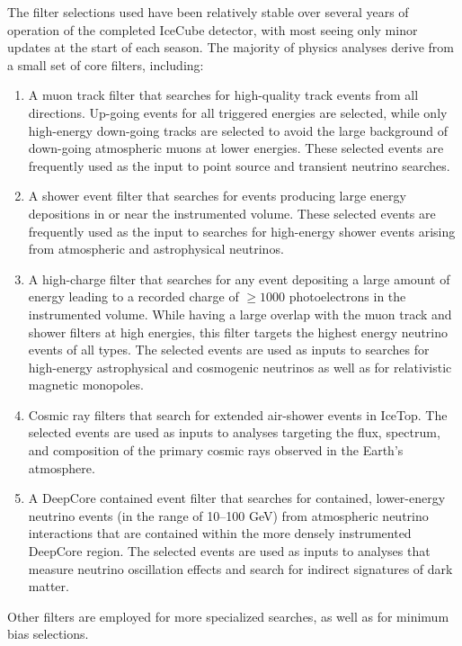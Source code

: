 The filter selections used have been relatively stable over several years
of operation of the completed IceCube detector, with most seeing only minor
updates at the 
start of each season.  The majority of physics analyses derive from a small
set of core filters, including:

\begin{enumerate}
\item A muon track filter that searches for high-quality track events from all
  directions.  Up-going events for all triggered energies are selected,
  while only high-energy 
  down-going tracks are selected to avoid the large background of
  down-going atmospheric muons at lower energies.  These selected events
  are frequently used as the input to point source and transient neutrino searches.
\item A shower event filter that searches for events producing large energy
  depositions in or near the instrumented volume.  These selected events are
  frequently used as the input to searches for high-energy shower events arising from
  atmospheric and astrophysical neutrinos.
\item A high-charge filter that searches for any event depositing a
  large amount of energy leading to a recorded charge of $\geq1000$
  photoelectrons in the 
  instrumented volume.  While having a large overlap with the muon track
  and shower filters at high energies, this filter targets the highest
  energy neutrino events of all types. The selected events are used as
  inputs to searches for high-energy astrophysical and cosmogenic
  neutrinos as well as for relativistic magnetic monopoles.
\item Cosmic ray filters that search for extended air-shower events in
  IceTop.  The selected events are used as inputs to analyses 
  targeting the flux, spectrum, and composition of the primary cosmic rays
  observed in the Earth's atmosphere.
\item A DeepCore contained event filter that searches for contained, lower-energy
  neutrino events (in the range of 10--100 GeV) from atmospheric neutrino interactions
  that are contained within the more densely instrumented DeepCore region.
  The selected events are used as inputs to analyses that measure
  neutrino oscillation effects and search for indirect signatures of dark matter.
\end{enumerate}

\noindent Other filters are employed for more specialized searches, as well as for minimum bias selections.

